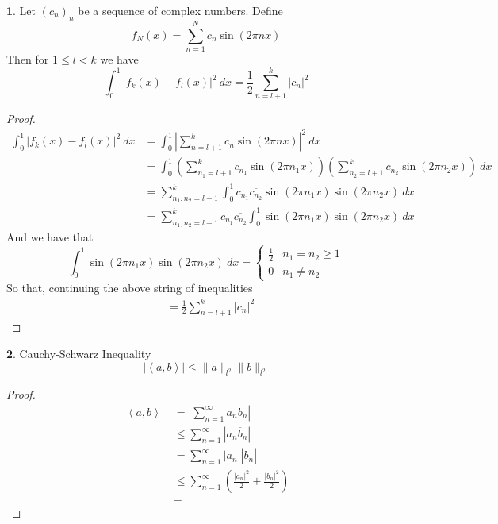 \documentclass[11pt]{article}
\numberwithin{equation}{section}
\theoremstyle{definition}
\newtheorem{claim}{\color{ForestGreen}{\textbf{Claim}}}[section]
\theoremstyle{definition}
\newcommand\parens[1]{\left( #1 \right)}
\newcommand\angles[1]{\left\langle #1 \right\rangle}
\newcommand\abs[1]{\left| #1 \right|}
\newcommand\norm[1]{\lVert#1\rVert}
\newcommand{\1}{\mathbbm 1}
\newcommand{\CC}{\mathbb C}
\begin{document}
\begin{claim}
	Let $(c_n)_n$ be a sequence of complex numbers. Define
	\begin{equation}
		f_N(x) = \sum_{n=1}^N c_n \sin(2\pi n x)
	\end{equation}
	Then for $1 \leq l < k$ we have 
	\begin{equation}
		\int_0^1 \abs{f_k(x) - f_l(x)}^2 \ dx = \frac{1}{2} \sum_{n=l + 1}^k \abs{c_n}^2
	\end{equation}
\end{claim}
\begin{proof}
	\begin{align*}
		\int_0^1 \abs{f_k(x) - f_l(x)}^2 \ dx &= \int_0^1 \abs{\sum_{n=l+1}^k c_n \sin(2\pi n x)}^2 \ dx \\
		&= \int_0^1 \parens{\sum_{n_1=l+1}^k c_{n_1} \sin(2\pi n_1 x)}\parens{\sum_{n_2=l+1}^k \overline{c_{n_2}} \sin(2\pi n_2 x)} \ dx \tag{for $z \in \CC$ we have $\abs{z}^2 = zz^*$} \\
		&= \sum_{n_1,n_2 = l + 1}^k \int_0^1 c_{n_1} \overline{c_{n_2}} \sin(2\pi n_1 x) \sin(2\pi n_2 x) \ dx \tag{exchange integral and sum, combine sums} \\
		&= \sum_{n_1,n_2 = l + 1}^k c_{n_1} \overline{c_{n_2}} \int_0^1 \sin(2\pi n_1 x) \sin(2\pi n_2 x) \ dx 
	\end{align*}
	And we have that
	\begin{equation}
		\int_0^1 \sin(2\pi n_1 x) \sin(2\pi n_2 x) \ dx = 
		\begin{cases}
			\frac{1}{2} & n_1 = n_2 \geq 1 \\
			0 & n_1 \neq n_2
		\end{cases}
	\end{equation}
	So that, continuing the above string of inequalities
	\begin{align*}
		&= \frac{1}{2}\sum_{n=l+1}^k \abs{c_n}^2
	\end{align*}
\end{proof}

\begin{claim}
	Cauchy-Schwarz Inequality 
	\begin{equation}
		\abs{\angles{a,b}} \leq \norm{a}_{l^2} \norm{b}_{l^2}
	\end{equation}
\end{claim}
\begin{proof}
	\begin{align*}
		\abs{\angles{a,b}} &= \abs{\sum_{n=1}^\infty a_n \overline{b}_n} \\
		&\leq \sum_{n=1}^\infty \abs{a_n \overline{b}_n} \\
		&= \sum_{n=1}^\infty \abs{a_n} \abs{\overline{b}_n} \\
		&\leq \sum_{n=1}^\infty \parens{\frac{\abs{a_n}^2}{2} + \frac{\abs{b_n}^2}{2}} \\
		&= 
	\end{align*}
	
\end{proof}
\end{document}
